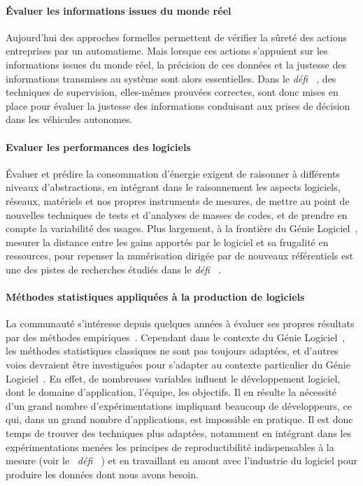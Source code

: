 \documentclass[11pt]{article}
\newcommand{\GL}[0]{Génie Logiciel~}
\newcommand{\defi}[1]{\emph{défi~%
\cite{#1}}}
\begin{document}
\paragraph{Évaluer les informations issues du monde réel}
Aujourd'hui des approches formelles permettent de vérifier la sûreté des actions entreprises par un automatisme. Mais lorsque ces actions s'appuient sur les informations issues du monde réel, la précision de ces données et la justesse des informations transmises au système sont alors essentielles. Dans le \defi{emergents}, 
des techniques de supervision,
elles-mêmes prouvées correctes, sont donc mises en place pour évaluer la justesse des informations conduisant aux prises de décision dans les véhicules autonomes.
 
 \paragraph{Evaluer les performances des logiciels}
Évaluer et prédire la consommation d'énergie  exigent de raisonner à différents niveaux d'abstractions, en intégrant dans le raisonnement les aspects logiciels, réseaux, matériels et nos propres instruments de mesures, de mettre au point de nouvelles techniques de tests et d'analyses de masses de codes, et de prendre en compte la variabilité des usages. Plus largement, à la frontière du \GL,  mesurer la distance entre les gains apportés par le logiciel et sa frugalité en ressources, pour repenser la numérisation dirigée par de nouveaux référentiels est une des pistes de recherches étudiés dans le \defi{vert}.


\paragraph{Méthodes statistiques appliquées à la production de logiciels}
La communauté s'intéresse depuis quelques années à évaluer ses propres résultats par des méthodes empiriques~\cite{yu2019characterizing}. Cependant dans le contexte du \GL, les méthodes statistiques classiques ne sont pas toujours adaptées, et d'autres voies devraient être investiguées pour s'adapter au contexte particulier du \GL. En effet, de nombreuses variables influent le développement logiciel, dont le domaine d'application, l'équipe, les objectifs. Il en résulte la nécessité d'un grand nombre d'expérimentations impliquant beaucoup de développeurs, ce qui, dans un grand nombre d'applications, est impossible en pratique. Il est donc temps de trouver des techniques plus adaptées, notamment en intégrant dans les expérimentations menées les principes de reproductibilité indispensables à la mesure (voir le
~\defi{GLE}) et en travaillant en amont avec l'industrie du logiciel pour produire les données dont nous avons besoin.
\end{document}
